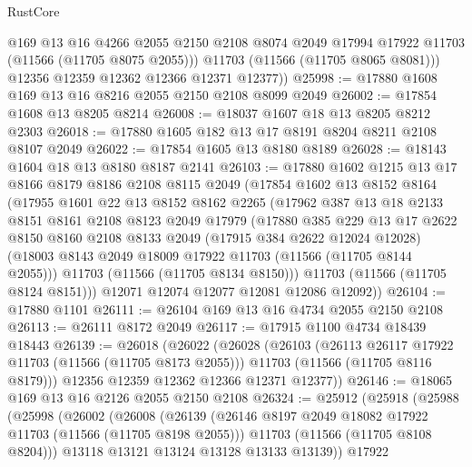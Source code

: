 \begin{lexlean}{RustCore}
\begin{coremodule}
            @169
            @13
            @16
            @4266
            @2055
            @2150
            @2108
            @8074
            @2049
            @17994
            @17922
            @11703
            (@11566 (@11705 @8075 @2055)))
          @11703
          (@11566 (@11705 @8065 @8081)))
        @12356
        @12359
        @12362
        @12366
        @12371
        @12377))
@25998 := @17880 @1608 @169 @13 @16 @8216 @2055 @2150 @2108 @8099 @2049
@26002 := @17854 @1608 @13 @8205 @8214
@26008 := @18037 @1607 @18 @13 @8205 @8212 @2303
@26018 := @17880 @1605 @182 @13 @17 @8191 @8204 @8211 @2108 @8107 @2049
@26022 := @17854 @1605 @13 @8180 @8189
@26028 := @18143 @1604 @18 @13 @8180 @8187 @2141
@26103 := @17880
    @1602
    @1215
    @13
    @17
    @8166
    @8179
    @8186
    @2108
    @8115
    @2049
    (@17854
      @1602
      @13
      @8152
      @8164
      (@17955
        @1601
        @22
        @13
        @8152
        @8162
        @2265
        (@17962
          @387
          @13
          @18
          @2133
          @8151
          @8161
          @2108
          @8123
          @2049
          @17979
          (@17880
            @385
            @229
            @13
            @17
            @2622
            @8150
            @8160
            @2108
            @8133
            @2049
            (@17915 @384 @2622 @12024 @12028)
            (@18003 @8143 @2049 @18009 @17922 @11703 (@11566 (@11705 @8144 @2055)))
            @11703
            (@11566 (@11705 @8134 @8150)))
          @11703
          (@11566 (@11705 @8124 @8151)))
        @12071
        @12074
        @12077
        @12081
        @12086
        @12092))
@26104 := @17880 @1101
@26111 := @26104 @169 @13 @16 @4734 @2055 @2150 @2108
@26113 := @26111 @8172 @2049
@26117 := @17915 @1100 @4734 @18439 @18443
@26139 := @26018
    (@26022
      (@26028
        (@26103
          (@26113 @26117 @17922 @11703 (@11566 (@11705 @8173 @2055)))
          @11703
          (@11566 (@11705 @8116 @8179)))
        @12356
        @12359
        @12362
        @12366
        @12371
        @12377))
@26146 := @18065 @169 @13 @16 @2126 @2055 @2150 @2108
@26324 := @25912
    (@25918
      (@25988
        (@25998
          (@26002
            (@26008
              (@26139
                (@26146 @8197 @2049 @18082 @17922 @11703 (@11566 (@11705 @8198 @2055)))
                @11703
                (@11566 (@11705 @8108 @8204)))
              @13118
              @13121
              @13124
              @13128
              @13133
              @13139))
          @17922

\end{coremodule}
\end{lexlean}
